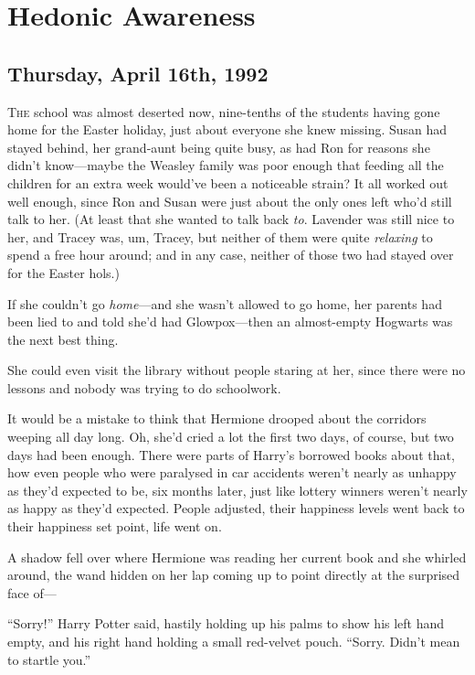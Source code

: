 \chapter{Hedonic Awareness}

\section{Thursday, April 16th, 1992}

\lettrine{T}{he} school was almost deserted now, nine-tenths of the students having gone home for the Easter holiday, just about everyone she knew missing. Susan had stayed behind, her grand-aunt being quite busy, as had Ron for reasons she didn’t know—maybe the Weasley family was poor enough that feeding all the children for an extra week would’ve been a noticeable strain? It all worked out well enough, since Ron and Susan were just about the only ones left who’d still talk to her. (At least that she wanted to talk back \emph{to}. Lavender was still nice to her, and Tracey was, um, Tracey, but neither of them were quite \emph{relaxing} to spend a free hour around; and in any case, neither of those two had stayed over for the Easter hols.)

If she couldn’t go \emph{home}—and she wasn’t allowed to go home, her parents had been lied to and told she’d had Glowpox—then an almost-empty Hogwarts was the next best thing.

She could even visit the library without people staring at her, since there were no lessons and nobody was trying to do schoolwork.

It would be a mistake to think that Hermione drooped about the corridors weeping all day long. Oh, she’d cried a lot the first two days, of course, but two days had been enough. There were parts of Harry’s borrowed books about that, how even people who were paralysed in car accidents weren’t nearly as unhappy as they’d expected to be, six months later, just like lottery winners weren’t nearly as happy as they’d expected. People adjusted, their happiness levels went back to their happiness set point, life went on.

A shadow fell over where Hermione was reading her current book and she whirled around, the wand hidden on her lap coming up to point directly at the surprised face of—

“Sorry!” Harry Potter said, hastily holding up his palms to show his left hand empty, and his right hand holding a small red-velvet pouch. “Sorry. Didn’t mean to startle you.”

